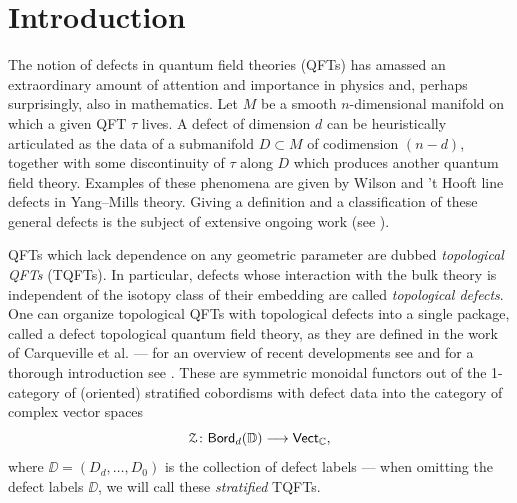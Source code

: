 \chapter{Introduction}

The notion of defects in quantum field theories (QFTs) has amassed an extraordinary amount of attention and importance in physics and, perhaps surprisingly, also in mathematics. Let $M$ be a smooth $n$-dimensional manifold on which a given QFT $\tau$ lives. A defect of dimension $d$ can be heuristically articulated as the data of a submanifold $D\subset M$ of codimension $(n-d)$, together with some discontinuity of $\tau$ along $D$ which produces another quantum field theory. Examples of these phenomena are given by Wilson and ’t Hooft line defects in Yang--Mills theory. Giving a definition and a classification of these general defects is the subject of extensive ongoing work (see \cite{CEG23,CZR25}).

QFTs which lack dependence on any geometric parameter are dubbed \emph{topological QFTs} (TQFTs). In particular, defects whose interaction with the bulk theory is independent of the isotopy class of their embedding are called \emph{topological defects}. One can organize topological QFTs with topological defects into a single package, called a defect topological quantum field theory, as they are defined in the work of Carqueville et al. — for an overview of recent developments see \cite{CZR25} and for a thorough introduction see \cite{CRS19}. These are symmetric monoidal functors out of the 1-category of (oriented) stratified cobordisms with defect data into the category of complex vector spaces
\begin{equation}
\mathcal Z \colon \mathsf{Bord}_{d}(\mathbb D) \longrightarrow \mathsf{Vect}_{\mathbb C},
\end{equation}
where $\DD=(D_d,\ldots,D_0)$ is the collection of defect labels — when omitting the defect labels $\DD$, we will call these \emph{stratified} TQFTs.

